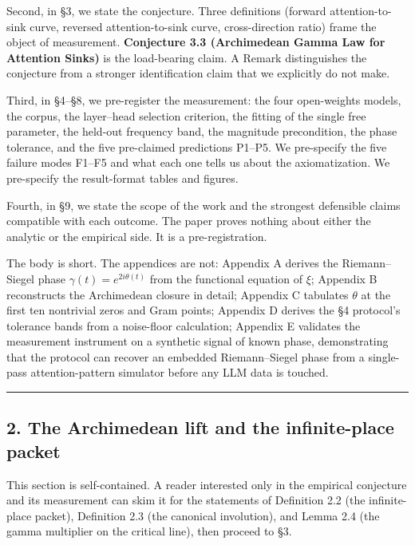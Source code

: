 \documentclass[
  letterpaper,
  11pt]{article}
\theoremstyle{plain}
\theoremstyle{definition}
\theoremstyle{remark}
\begin{document}
Second, in §3, we state the conjecture. Three definitions (forward attention-to-sink curve, reversed attention-to-sink curve, cross-direction ratio) frame the object of measurement. \textbf{Conjecture 3.3 (Archimedean Gamma Law for Attention Sinks)} is the load-bearing claim. A Remark distinguishes the conjecture from a stronger identification claim that we explicitly do not make.

Third, in §4--§8, we pre-register the measurement: the four open-weights models, the corpus, the layer--head selection criterion, the fitting of the single free parameter, the held-out frequency band, the magnitude precondition, the phase tolerance, and the five pre-claimed predictions P1--P5. We pre-specify the five failure modes F1--F5 and what each one tells us about the axiomatization. We pre-specify the result-format tables and figures.

Fourth, in §9, we state the scope of the work and the strongest defensible claims compatible with each outcome. The paper proves nothing about either the analytic or the empirical side. It is a pre-registration.

The body is short. The appendices are not: Appendix A derives the Riemann--Siegel phase \(\gamma(t) = e^{2i\theta(t)}\) from the functional equation of \(\xi\); Appendix B reconstructs the Archimedean closure in detail; Appendix C tabulates \(\theta\) at the first ten nontrivial zeros and Gram points; Appendix D derives the §4 protocol's tolerance bands from a noise-floor calculation; Appendix E validates the measurement instrument on a synthetic signal of known phase, demonstrating that the protocol can recover an embedded Riemann--Siegel phase from a single-pass attention-pattern simulator before any LLM data is touched.

\begin{center}\rule{0.5\linewidth}{0.5pt}\end{center}

\subsection{2. The Archimedean lift and the infinite-place packet}\label{the-archimedean-lift-and-the-infinite-place-packet}

This section is self-contained. A reader interested only in the empirical conjecture and its measurement can skim it for the statements of Definition 2.2 (the infinite-place packet), Definition 2.3 (the canonical involution), and Lemma 2.4 (the gamma multiplier on the critical line), then proceed to §3.
\end{document}
